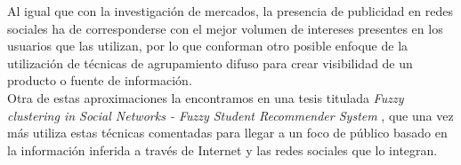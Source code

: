 \documentclass[]{report}
\begin{document}
			Al igual que con la investigación de mercados, la presencia de publicidad en redes sociales ha de corresponderse con el mejor volumen de intereses presentes en los usuarios que las utilizan, por lo que conforman otro posible enfoque de la utilización de técnicas de agrupamiento difuso para crear visibilidad de un producto o fuente de información.\\
			
			Otra de estas aproximaciones la encontramos en una tesis titulada \textit{Fuzzy clustering in Social Networks - Fuzzy Student Recommender System} \cite{recommendation}, que una vez más utiliza estas técnicas comentadas para llegar a un foco de público basado en la información inferida a través de Internet y las redes sociales que lo integran.
			


\end{document}
